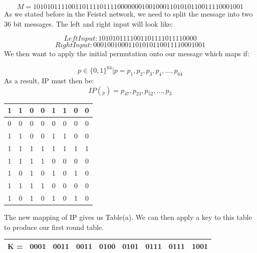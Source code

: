\documentclass[11pt,a4paper]{report}
\begin{document}
\begin{displaymath}
M = 1010 1011 1100 1101 1110 1111 0000 0001 0010 0011 0101 0110 0111 1000 1001
\end{displaymath}
As we stated before in the Feistel network, we need to split the message into two 36 bit messages. The left and right input will look like:

\begin{displaymath}
Left Input: 1010 1011 1100 1101 1110 1111 0000
\end{displaymath}
\begin{displaymath}
Right Input: 0001 0010 0011 0101 0110 0111 1000 1001
\end{displaymath}
We then want to apply the initial permutation onto our message which maps if:

\begin{displaymath}
p \in \{0,1\}^{64} | p = p_{1}, p_{2}, p_{3}, p_{4},...,p_{64} 
\end{displaymath}
As a result, IP must then be:
\begin{displaymath}
IP(_{p}) = p_{47}, p_{23}, p_{52},...,p_{3}
\end{displaymath}

\begin{center}
\begin{tabular}{ |c|c|c|c|c|c|c|c| }
\hline
1 & 1 & 0 & 0 & 1 & 1 & 0 & 0\\ \hline
0 & 0 & 0 & 0 & 0 & 0 & 0 & 0\\ \hline
1 & 1 & 0 & 0 & 1 & 1 & 0 & 0\\ \hline
1 & 1 & 1 & 1 & 1 & 1 & 1 & 1\\ \hline
1 & 1 & 1 & 1 & 0 & 0 & 0 & 0\\ \hline
1 & 0 & 1 & 0 & 1 & 0 & 1 & 0\\ \hline
1 & 1 & 1 & 1 & 0 & 0 & 0 & 0\\ \hline
1 & 0 & 1 & 0 & 1 & 0 & 1 & 0\\ \hline
\end{tabular}
\end{center}
The new mapping of IP gives us Table(a). We can then apply a key to this table to produce our first round table.\newline

\noindent \begin{tabular}{|c|c|c|c|c|c|c|c|c|} \hline
K = & 0001 & 0011 & 0011 & 0100 & 0101 & 0111 & 0111 & 1001 
\\ \hline
\end{tabular} 
\end{document}
